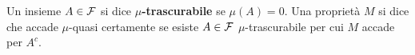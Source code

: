 \begin{multicols*}{2}
\begin{definition}
    Un insieme $A \in \mathcal{F}$ si dice \textbf{$\mu$-trascurabile} se
    $\mu(A) = 0$. Una proprietà $M$ si dice che accade
    $\mu$-quasi certamente se esiste $A \in \mathcal{F}$ $\mu$-trascurabile per cui
    $M$ accade per $A^c$.
\end{definition}


\end{multicols*}